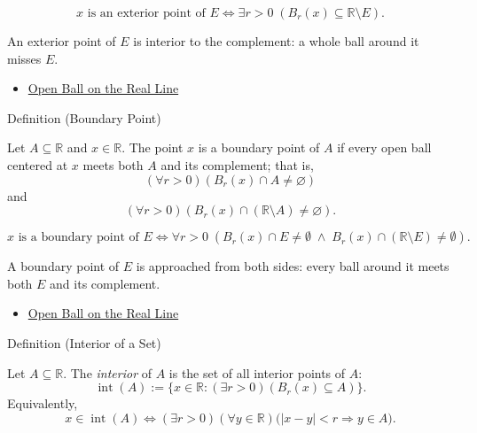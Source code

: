 \begin{remark*}
\[
x \text{ is an exterior point of } E \Longleftrightarrow \exists r>0\;(B_{r}(x)\subseteq \mathbb{R}\setminus E).
\]
\end{remark*}
\begin{remark*}[Interpretation]
An exterior point of $E$ is interior to the complement: a whole ball around it misses $E$.
\end{remark*}
\begin{dependencies}
\begin{itemize}
  \item \hyperref[def:open-ball]{Open Ball on the Real Line}
\end{itemize}
\end{dependencies}
\begin{definitionbox}{Definition (Boundary Point)}
\begin{definition}
\label{def:boundary-point}
Let $A\subseteq\mathbb{R}$ and $x\in\mathbb{R}$.  The point $x$ is a
boundary point of $A$ if every open ball centered at $x$ meets both $A$ and
its complement; that is,
\[
  (\forall r>0)(B_r(x)\cap A\neq\varnothing)
\]
and
\[
  (\forall r>0)(B_r(x)\cap(\mathbb{R}\setminus A)\neq\varnothing).
\]
\end{definition}
\end{definitionbox}
\begin{remark*}
\[
x \text{ is a boundary point of } E \Longleftrightarrow \forall r>0\;(B_{r}(x)\cap E\neq\emptyset \;\land\; B_{r}(x)\cap(\mathbb{R}\setminus E)\neq\emptyset).
\]
\end{remark*}
\begin{remark*}[Interpretation]
A boundary point of $E$ is approached from both sides: every ball around it meets both $E$ and its complement.
\end{remark*}
\begin{dependencies}
\begin{itemize}
  \item \hyperref[def:open-ball]{Open Ball on the Real Line}
\end{itemize}
\end{dependencies}
\begin{definitionbox}{Definition (Interior of a Set)}
\begin{definition}
\label{def:interior-of-set}
Let $A\subseteq\mathbb{R}$.  The \emph{interior} of $A$ is the set of all
interior points of $A$:
\[
  \operatorname{int}(A)
  :=
  \{x\in\mathbb{R}:(\exists r>0)(B_r(x)\subseteq A)\}.
\]
Equivalently,
\[
  x\in\operatorname{int}(A)
  \Longleftrightarrow
  (\exists r>0)(\forall y\in\mathbb{R})
  \bigl(|x-y|<r\Longrightarrow y\in A\bigr).
\]
\end{definition}
\end{definitionbox}
